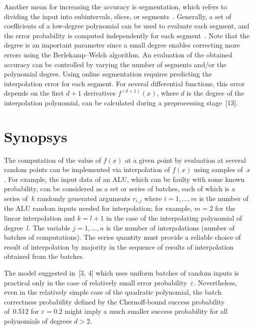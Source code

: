 \begin{multicols}{2}
     Another mean for increasing the accuracy is segmentation, which refers to dividing the input into subintervals, 
slices, or segments~\cite{10-dol}. Generally, a set of coefficients of a low-degree polynomial can be used to evaluate 
each segment, and the error probability is computed independently for each segment~\cite{10-dol}. Note that the degree 
is an important parameter since a small degree enables correcting more errors using the 
Berlekamp--Welch algorithm. An 
evaluation of the obtained accuracy can be controlled by varying the number of segments and/or the polynomial degree. 
Using online segmentation requires predicting the interpolation error for each segment. For several differential 
functions, this error depends on the first $d+1$ derivatives $f^{(d+1)}(x)$, where $d$ is the
 degree of the interpolation 
polynomial, can be calculated during a preprocessing stage~[13]. 
     
\section{Synopsys}

\noindent
The computation of the value of $f(x)$ at a given point   by evaluation at several random points can be implemented via 
interpolation of $f(x)$ using samples of~$x$. For example, the input data of an ALU, which can be faulty with some known 
probability, can be considered as a set or series of batches, each of which is a series of~$k$  randomly generated 
arguments $r_{i,j}$ where $i=1,\ldots ,m$  is the number of the ALU random inputs 
needed for interpolation; for example, $m=2$ 
for the linear interpolation and $k=l+1$ in the case of the interpolating polynomial 
of degree~$l$. The variable $j=1,\ldots ,n$ is the 
number of interpolations (number of batches of computations). The series quantity must provide a reliable choice of result of 
interpolation by majority in the sequence of results of interpolation obtained from the batches. 
    
    The model suggested in~[3, 4] which uses uniform batches of random inputs is practical only in the case of 
relatively small error probability~$\varepsilon$. Nevertheless, even in the relatively simple case of the quadratic 
polynomial, the batch correctness probability defined by the Chernoff-bound success probability of~0.512 for 
$\varepsilon=0.2$ might imply a much smaller success probability for all polynomials of degrees $d>2$.
    

\end{multicols}
